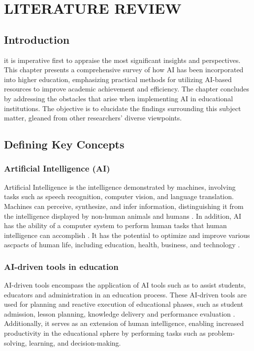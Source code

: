 \chapter{LITERATURE REVIEW}
\section{Introduction}
\justifying
it is imperative first to appraise the most significant
insights and perspectives. This chapter presents a comprehensive survey of how AI has been
incorporated into higher education, emphasizing practical methods for utilizing AI-based
resources to improve academic achievement and efficiency.
The chapter concludes by addressing the obstacles that arise when implementing AI in educational
institutions. The objective is to elucidate the findings surrounding this subject matter, gleaned from other
researchers' diverse viewpoints.

\section{Defining Key Concepts}
\subsection{Artificial Intelligence (AI)}
Artificial Intelligence is the intelligence demonstrated by machines,
involving tasks such as speech recognition, computer vision,
and language translation.  Machines can perceive, synthesize, and infer information,
distinguishing it from the intelligence displayed by non-human animals and humans \citep{ola_artificial_2023}.
In addition, AI has the ability of  a computer system
to perform human tasks that
human intelligence can accomplish \citep{sadiku_ai_2021}.
It has the potential to optimize and improve various ascpacts
of human life, including education, health, business,
and technology \citep{cheng_widespread_2023}.
\subsection{AI-driven tools in education}
AI-driven tools encompass the application of AI tools such as  to assist students,
educators and administration in an education process. These AI-driven tools are used for
planning and reactive execution of educational phases, such as student admission, lesson planning,
knowledge delivery and performance evaluation \citep{mallik_proactive_2023}.
Additionally, it serves as an extension of human intelligence, enabling increased productivity in
the educational sphere by performing tasks such as problem-solving, learning, and decision-making\citep{cheng_widespread_2023}.
